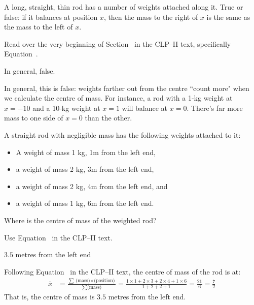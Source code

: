 \begin{Mquestion}
 A long, straight, thin rod has a number of weights attached along it. True or false: if it balances at  position $x$, then the mass to the right of $x$ is the same as the mass to the left of $x$.
\end{Mquestion}
\begin{hint}
Read over the very beginning of Section~ in the CLP--II text, specifically Equation~.
\end{hint}
\begin{answer}
In general, false.
\end{answer}
\begin{solution}
In general, this is false: weights farther out from the centre ``count more" when we calculate the centre of mass. For instance, a rod with a 1-kg weight at $x=-10$ and a 10-kg weight at $x=1$ will balance at $x=0$. There's far more mass to one side of $x=0$ than the other.
\end{solution}
\begin{question}
A straight rod with negligible mass has the following weights attached to it:
\begin{itemize}
\item A weight of mass 1 kg, 1m from the left end,
\item a weight of mass 2 kg, 3m from the left end,
\item a weight of mass 2 kg, 4m from the left end, and
\item a weight of mass 1 kg, 6m from the left end.
\end{itemize}

Where is the centre of mass of the weighted rod?
\end{question}
\begin{hint}
Use Equation~ in the CLP--II text.
\end{hint}
\begin{answer}
$3.5$ metres from the left end
\end{answer}
\begin{solution}
Following Equation~ in the CLP--II text, the centre of mass of the rod is at:
\begin{align*}
\bar x &=\frac{\sum \text{(mass)$\times$(position)}}{\sum \text {(mass)}} = \frac{1\times 1 + 2\times 3 + 2\times 4 + 1 \times 6}{1+2+2+1}=\frac{21}{6}=\frac{7}{2}
\end{align*}
That is, the centre of mass is $3.5$ metres from the left end.
\end{solution}
